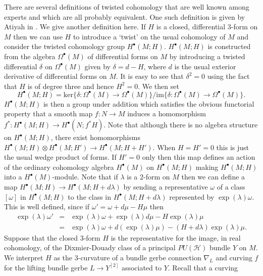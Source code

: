 \documentclass[a4paper,reqno]{amsart}
\theoremstyle{plain}
\theoremstyle{definition}
\theoremstyle{remark}
\numberwithin{equation}{section}
\numberwithin{figure}{section}
\newcommand{\<}{\langle}
\renewcommand{\>}{\rangle}
\begin{document}
There are several definitions of twisted cohomology 
that are well known among experts and which are all 
probably equivalent.  One such definition is 
given by Atiyah in \cite{Ati2}.  We give another 
definition here.   
If $H$ is a closed, differential $3$-form on 
$M$ then we can use $H$ to introduce 
a `twist' on the usual cohomology of $M$ and consider the 
twisted cohomology group $H^\bullet(M;H)$.   
$H^\bullet(M;H)$ is constructed 
from the algebra $\Omega^\bullet(M)$ of differential forms 
on $M$ by introducing a twisted differential $\delta$ on $\Omega^\bullet(M)$ 
given by $\delta = d-H$, where $d$ is the usual exterior derivative of 
differential forms on $M$.  It is easy to see that 
$\delta^2 = 0$ using the fact that $H$ is of degree 
three and hence $H^2 = 0$.  We then set 
$$ 
H^\bullet(M;H) = \text{ker}\{\delta\colon \Omega^\bullet(M) 
\to \Omega^\bullet(M)\}/\text{im}\{\delta\colon \Omega^\bullet(M) 
\to \Omega^\bullet(M)\}. 
$$
$H^\bullet(M;H)$ is then a group under addition which 
satisfies the obvious functorial property that a 
smooth map $f\colon N\to M$ induces a homomorphism 
$f^*\colon H^\bullet(M;H) \to H^\bullet(N;f^*H)$.   
Note that although there is no algebra structure on 
$H^\bullet(M;H)$, there exist homomorphisms 
$H^\bullet(M;H)\otimes H^\bullet(M;H') \to 
H^\bullet(M;H+H')$.  When $H = H' = 0$ this is 
just the usual wedge product of forms.  If $H' = 0$ only 
then this map defines an action of the ordinary cohomology algebra  
$H^\bullet(M)$ on $H^\bullet(M;H)$ making 
$H^\bullet(M;H)$ into 
a $H^\bullet(M)$-module.  Note that if $\lambda$ is a 
$2$-form on $M$ then we can define a map $H^\bullet(M;H) 
\to H^\bullet(M;H+d\lambda)$ by sending a representative 
$\omega$ of a class $[\omega]$ in $H^\bullet(M;H)$ to 
the class in $H^\bullet(M;H+d\lambda)$ represented by 
$\exp(\lambda)\omega$.  This is well defined, since if 
$\omega' = \omega + d\mu - H\mu$ then 
\begin{eqnarray*} 
\exp(\lambda)\omega' & = & \exp(\lambda)\omega   
+ \exp(\lambda)d\mu - H\exp(\lambda)\mu           \\ 
& = & \exp(\lambda)\omega + d(\exp(\lambda)\mu) - 
(H+ d\lambda)\exp(\lambda)\mu. 
\end{eqnarray*} 
Suppose that the closed $3$-form 
$H$ is the representative for the image, in real 
cohomology, of the Dixmier-Douady class of a principal 
$PU(\mathcal{H})$ bundle $Y$ on $M$.  We interpret 
$H$ as the $3$-curvature of a bundle gerbe connection 
$\nabla_L$ and curving $f$ for the lifting bundle gerbe 
$L\to Y^{[2]}$ associated to $Y$.  Recall that a curving 
\end{document}
